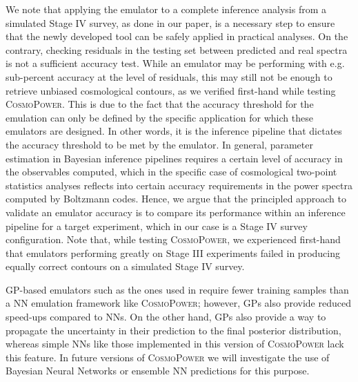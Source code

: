 \documentclass[fleqn,usenatbib]{mnras}
\begin{document}
We note that applying the emulator to a complete inference analysis from a simulated Stage IV survey, as done in our paper, is a necessary step to ensure that the newly developed tool can be safely applied in practical analyses. On the contrary, checking residuals in the testing set between predicted and real spectra is not a sufficient accuracy test. While an emulator may be performing with e.g. sub-percent accuracy at the level of residuals, this may still not be enough to retrieve unbiased cosmological contours, as we verified first-hand while testing \textsc{CosmoPower}. This is due to the fact that the accuracy threshold for the emulation can only be defined by the specific application for which these emulators are designed. In other words, it is the inference pipeline that dictates the accuracy threshold to be met by the emulator. In general, parameter estimation in Bayesian inference pipelines requires a certain level of accuracy in the observables computed, which in the specific case of cosmological two-point statistics analyses reflects into certain accuracy requirements in the power spectra computed by Boltzmann codes. Hence, we argue that the principled approach to validate an emulator accuracy is to compare its performance within an inference pipeline for a target experiment, which in our case is a Stage IV survey configuration. Note that, while testing \textsc{CosmoPower}, we experienced first-hand that emulators performing greatly on Stage III experiments failed in producing equally correct contours on a simulated Stage IV survey.

GP-based emulators such as the ones used in \citet{Mootoovaloo20, Mootoovaloo21, Ramachandra20, Ho21} require fewer training samples than a NN emulation framework like \textsc{CosmoPower}; however, GPs also provide reduced speed-ups compared to NNs. On the other hand, GPs also provide a way to propagate the uncertainty in their prediction to the final posterior distribution, whereas simple NNs like those implemented in this version of \textsc{CosmoPower} lack this feature. In future versions of \textsc{CosmoPower} we will investigate the use of Bayesian Neural Networks or ensemble NN predictions for this purpose.
\end{document}
